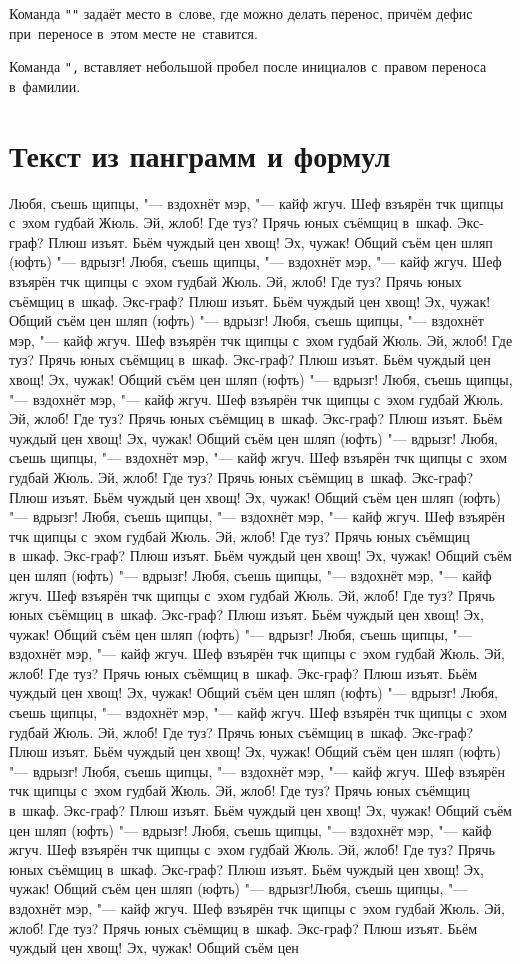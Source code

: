 Команда \verb|""| задаёт место в~слове, где можно делать перенос, причём дефис
при~переносе в~этом месте не~ставится.

Команда \verb|",| вставляет небольшой пробел после инициалов с~правом переноса
в~фамилии.

\section{Текст из панграмм и формул}

Любя, съешь щипцы, "--- вздохнёт мэр, "--- кайф жгуч. Шеф взъярён тчк щипцы
с~эхом гудбай Жюль. Эй, жлоб! Где туз? Прячь юных съёмщиц в~шкаф. Экс-граф?
Плюш изъят. Бьём чуждый цен хвощ! Эх, чужак! Общий съём цен шляп (юфть) "---
вдрызг! Любя, съешь щипцы, "--- вздохнёт мэр, "--- кайф жгуч. Шеф взъярён тчк
щипцы с~эхом гудбай Жюль. Эй, жлоб! Где туз? Прячь юных съёмщиц в~шкаф.
Экс-граф? Плюш изъят. Бьём чуждый цен хвощ! Эх, чужак! Общий съём цен шляп
(юфть) "--- вдрызг! Любя, съешь щипцы, "--- вздохнёт мэр, "--- кайф жгуч. Шеф
взъярён тчк щипцы с~эхом гудбай Жюль. Эй, жлоб! Где туз? Прячь юных съёмщиц
в~шкаф. Экс-граф? Плюш изъят. Бьём чуждый цен хвощ! Эх, чужак! Общий съём цен
шляп (юфть) "--- вдрызг! Любя, съешь щипцы, "--- вздохнёт мэр, "--- кайф жгуч.
Шеф взъярён тчк щипцы с~эхом гудбай Жюль. Эй, жлоб! Где туз? Прячь юных съёмщиц
в~шкаф. Экс-граф? Плюш изъят. Бьём чуждый цен хвощ! Эх, чужак! Общий съём цен
шляп (юфть) "--- вдрызг! Любя, съешь щипцы, "--- вздохнёт мэр, "--- кайф жгуч.
Шеф взъярён тчк щипцы с~эхом гудбай Жюль. Эй, жлоб! Где туз? Прячь юных съёмщиц
в~шкаф. Экс-граф? Плюш изъят. Бьём чуждый цен хвощ! Эх, чужак! Общий съём цен
шляп (юфть) "--- вдрызг! Любя, съешь щипцы, "--- вздохнёт мэр, "--- кайф жгуч.
Шеф взъярён тчк щипцы с~эхом гудбай Жюль. Эй, жлоб! Где туз? Прячь юных съёмщиц
в~шкаф. Экс-граф? Плюш изъят. Бьём чуждый цен хвощ! Эх, чужак! Общий съём цен
шляп (юфть) "--- вдрызг! Любя, съешь щипцы, "--- вздохнёт мэр, "--- кайф жгуч.
Шеф взъярён тчк щипцы с~эхом гудбай Жюль. Эй, жлоб! Где туз? Прячь юных съёмщиц
в~шкаф. Экс-граф? Плюш изъят. Бьём чуждый цен хвощ! Эх, чужак! Общий съём цен
шляп (юфть) "--- вдрызг! Любя, съешь щипцы, "--- вздохнёт мэр, "--- кайф жгуч.
Шеф взъярён тчк щипцы с~эхом гудбай Жюль. Эй, жлоб! Где туз? Прячь юных съёмщиц
в~шкаф. Экс-граф? Плюш изъят. Бьём чуждый цен хвощ! Эх, чужак! Общий съём цен
шляп (юфть) "--- вдрызг! Любя, съешь щипцы, "--- вздохнёт мэр, "--- кайф жгуч.
Шеф взъярён тчк щипцы с~эхом гудбай Жюль. Эй, жлоб! Где туз? Прячь юных съёмщиц
в~шкаф. Экс-граф? Плюш изъят. Бьём чуждый цен хвощ! Эх, чужак! Общий съём цен
шляп (юфть) "--- вдрызг! Любя, съешь щипцы, "--- вздохнёт мэр, "--- кайф жгуч.
Шеф взъярён тчк щипцы с~эхом гудбай Жюль. Эй, жлоб! Где туз? Прячь юных съёмщиц
в~шкаф. Экс-граф? Плюш изъят. Бьём чуждый цен хвощ! Эх, чужак! Общий съём цен
шляп (юфть) "--- вдрызг! Любя, съешь щипцы, "--- вздохнёт мэр, "--- кайф жгуч.
Шеф взъярён тчк щипцы с~эхом гудбай Жюль. Эй, жлоб! Где туз? Прячь юных съёмщиц
в~шкаф. Экс-граф? Плюш изъят. Бьём чуждый цен хвощ! Эх, чужак! Общий съём цен
шляп (юфть) "--- вдрызг!Любя, съешь щипцы, "--- вздохнёт мэр, "--- кайф жгуч.
Шеф взъярён тчк щипцы с~эхом гудбай Жюль. Эй, жлоб! Где туз? Прячь юных съёмщиц
в~шкаф. Экс-граф? Плюш изъят. Бьём чуждый цен хвощ! Эх, чужак! Общий съём цен


